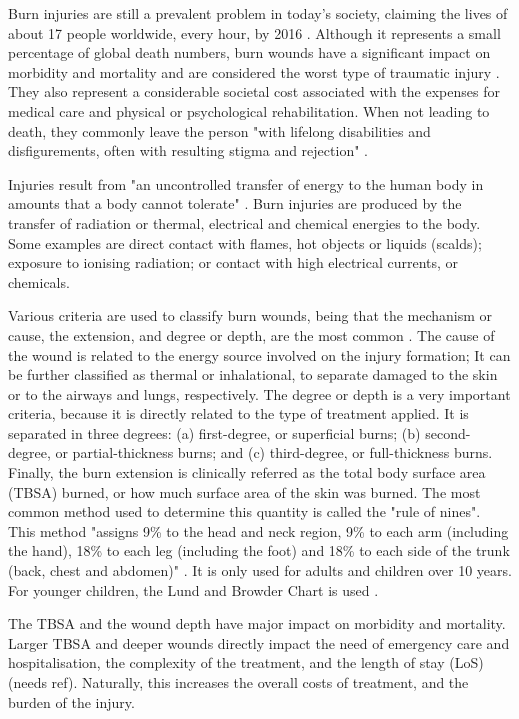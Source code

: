 Burn injuries are still a prevalent problem in today's society, claiming the lives of about 17 people worldwide, every hour, by 2016 \cite{GHE2016_xls}. Although it represents a small percentage of global death numbers, burn wounds have a significant impact on morbidity and mortality and are considered the worst type of traumatic injury \cite{isbi_guidelines_burn_care}. They also represent a considerable societal cost associated with the expenses for medical care and physical or psychological rehabilitation. When not leading to death, they commonly leave the person "with lifelong disabilities and disfigurements, often with resulting stigma and rejection" \cite{who2011_sucess_stories}.

Injuries result from "an uncontrolled transfer of energy to the human body in amounts that a body cannot tolerate" \cite{who2011_sucess_stories}. Burn injuries are produced by the transfer of radiation or thermal, electrical and chemical energies to the body. Some examples are direct contact with flames, hot objects or liquids (scalds); exposure to ionising radiation; or contact with high electrical currents, or chemicals. 

Various criteria are used to classify burn wounds, being that the mechanism or cause, the extension, and degree or depth, are the most common \cite{who_unicef2008_burns_chapter}. The cause of the wound is related to the energy source involved on the injury formation; It can be further classified as thermal or inhalational, to separate damaged to the skin or to the airways and lungs, respectively. The degree or depth is a very important criteria, because it is directly related to the type of treatment applied. It is separated in three degrees: (a) first-degree, or superficial burns; (b) second-degree, or partial-thickness burns; and (c) third-degree, or full-thickness burns. Finally, the burn extension is clinically referred as the total body surface area (TBSA) burned, or how much surface area of the skin was burned. The most common method used to determine this quantity is called the "rule of nines". This method "assigns 9\% to the head and neck region, 9\% to each arm (including the hand), 18\% to each leg (including the foot) and 18\% to each side of the trunk (back, chest and abdomen)" \cite{who_unicef2008_burns_chapter}. It is only used for adults and children over 10 years. For younger children, the Lund and Browder Chart is used \cite{MacLennan1998_anesthesia_thermal_injury}. 

The TBSA and the wound depth have major impact on morbidity and mortality. Larger TBSA and deeper wounds directly impact the need of emergency care and hospitalisation, the complexity of the treatment, and the length of stay (LoS) {\color{red}(needs ref)}. Naturally, this increases the overall costs of treatment, and the burden of the injury.

